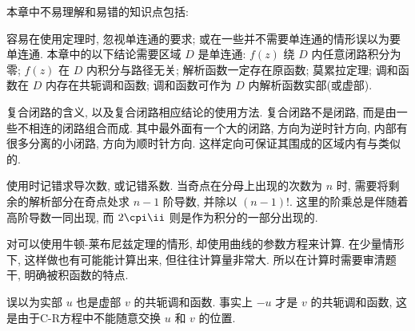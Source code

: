 本章中不易理解和易错的知识点包括:
\begin{enuma}
  \item 容易在使用定理时, 忽视单连通的要求; 或在一些并不需要单连通的情形误以为要单连通.
  本章中的以下结论需要区域 $D$ 是单连通: $f(z)$ 绕 $D$ 内任意闭路积分为零; $f(z)$ 在 $D$ 内积分与路径无关; 解析函数一定存在原函数; 莫累拉定理; 调和函数在 $D$ 内存在共轭调和函数; 调和函数可作为 $D$ 内解析函数实部(或虚部).
  \item 复合闭路的含义, 以及复合闭路相应结论的使用方法.
  复合闭路不是闭路, 而是由一些不相连的闭路组合而成.
  其中最外面有一个大的闭路, 方向为逆时针方向, 内部有很多分离的小闭路, 方向为顺时针方向.
  这样定向可保证其围成的区域内有与\thmCR 类似的\thmCCC.
  \item 使用\thmCIH 时记错求导次数, 或记错系数. 当奇点在分母上出现的次数为 $n$ 时, 需要将剩余的解析部分在奇点处求 $n-1$ 阶导数, 并除以 $(n-1)!$. 这里的阶乘总是伴随着高阶导数一同出现, 而 $2\cpi\ii$ 则是作为积分的一部分出现的.
  \item 对可以使用牛顿-莱布尼兹定理的情形, 却使用曲线的参数方程来计算. 在少量情形下, 这样做也有可能能计算出来, 但往往计算量非常大. 所以在计算时需要审清题干, 明确被积函数的特点.
  \item 误以为实部 $u$ 也是虚部 $v$ 的共轭调和函数. 事实上 $-u$ 才是 $v$ 的共轭调和函数, 这是由于C-R方程中不能随意交换 $u$ 和 $v$ 的位置.
\end{enuma}

\newpage
{}

